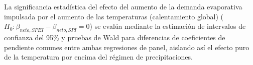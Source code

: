 La significancia estadística del efecto del aumento de la demanda evaporativa impulsada por el aumento de las temperaturas (calentamiento global) ($H_0: \beta_{neto, SPEI} - \beta_{neto, SPI} = 0$) se evalúa mediante la estimación de intervalos de confianza del 95\% y pruebas de Wald para diferencias de coeficientes de pendiente comunes entre ambas regresiones de panel, aislando así el efecto puro de la temperatura por encima del régimen de precipitaciones.
